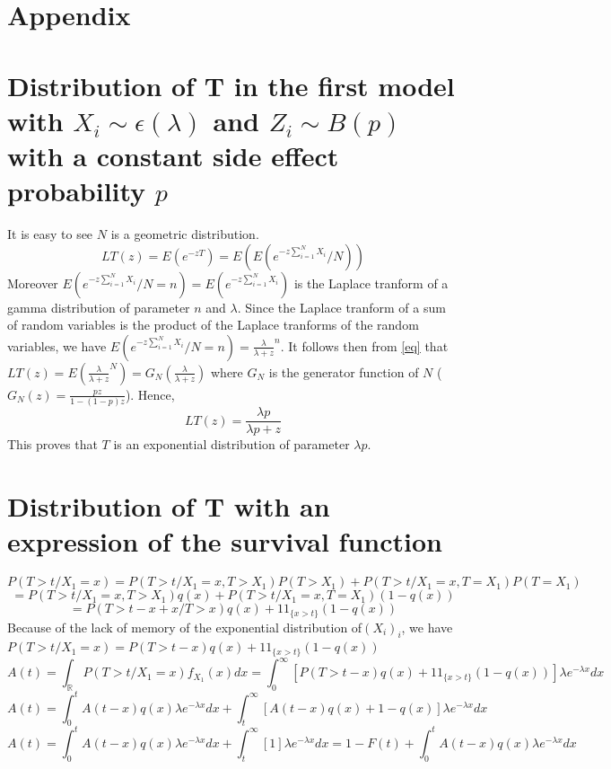 \documentclass[12pt,twoside]{article}
\begin{document}
\newpage
 \section{Appendix}



\footnotesize{
\appendix



\section{Distribution of T in the first model with $X_i \sim \epsilon(\lambda)$
 and $Z_i \sim B(p)$ with a constant side effect probability $p$ }

\label{mod1_dem1}

It is easy to see $N$ is a geometric distribution.
\begin{equation}
LT(z)=E(e^{-zT})=E(E(e^{-z\sum_{i=1}^N X_i}/N))
\end{equation}
\label{eq}
Moreover $E(e^{-z\sum_{i=1}^N X_i}/N=n) = E(e^{-z\sum_{i=1}^N X_i})$ is
the Laplace tranform of a gamma distribution of parameter $n$ and $\lambda$.
Since the Laplace tranform of a sum of random variables is the product of
the Laplace tranforms of the random variables, we have $E(e^{-z\sum_{i=1}^N X_i}/N=n) 
= \frac{\lambda}{\lambda+z}^n$. It follows then from \ref{eq} that
$LT(z) = E(\frac{\lambda}{\lambda+z}^N) = G_N(\frac{\lambda}{\lambda+z})$ where
$G_N$ is the generator function of  $N$ ($G_N(z)=\frac{pz}{1-(1-p)z}$).
Hence, 
$$
LT(z) = \frac{\lambda p}{\lambda p + z}
$$
This proves that $T$ is an exponential distribution of parameter $\lambda p$.


\section{Distribution of T with an expression of the survival function}
\label{mod1_dem2}

$$P(T>t/X_1=x) = P(T>t/X_1=x,T>X_1)P(T>X_1) + P(T>t/X_1=x,T=X_1)P(T=X_1)$$
			$$= P(T>t/X_1=x,T>X_1)q(x) + P(T>t/X_1=x,T=X_1) (1 -q(x))$$
			$$= P(T>t-x+x/T>x)q(x) + 1\!\!1_{\{x>t\}}(1-q(x))$$
Because of the lack of memory of the exponential distribution of$(X_i)_i$,
we have $P(T>t/X_1=x) = P(T>t-x)q(x) + 1\!\!1_{\{x>t\}}(1-q(x))$
$$A(t) = \int_{\mathbb{R}} P(T>t/X_1=x) f_{X_1}(x) dx = \int_0^{\infty} [P(T>t-x)q(x) + 1\!\!1_{\{x>t\}}(1-q(x))] \lambda e^{-\lambda x} dx$$
$$A(t) = \int_0^t A(t-x)q(x)\lambda e^{-\lambda x} dx + \int_t^{\infty}[A(t-x)q(x)+1-q(x)] \lambda e^{-\lambda x} dx$$
$$A(t) = \int_0^t A(t-x)q(x)\lambda e^{-\lambda x} dx + \int_t^{\infty}[1] \lambda e^{-\lambda x} dx 
= 1-F(t)  + \int_0^t A(t-x)q(x)\lambda e^{-\lambda x} dx$$

}
\end{document}
